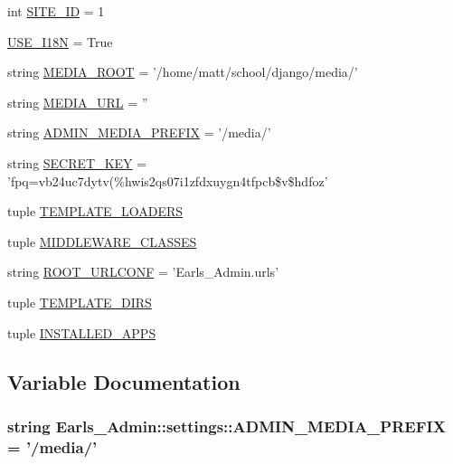 \begin{CompactItemize}
\item 
int \hyperlink{namespaceEarls__Admin_1_1settings_2fc043980861294abcff6dece3e61608}{SITE\_\-ID} = 1
\item 
\hyperlink{namespaceEarls__Admin_1_1settings_81596e34e2b70709757aa85c6d98570b}{USE\_\-I18N} = True
\item 
string \hyperlink{namespaceEarls__Admin_1_1settings_48b28eec713c9de9ed6cb2ff2b8a5453}{MEDIA\_\-ROOT} = '/home/matt/school/django/media/'
\item 
string \hyperlink{namespaceEarls__Admin_1_1settings_32367b73c89b853f97f4345da065eb4d}{MEDIA\_\-URL} = ''
\item 
string \hyperlink{namespaceEarls__Admin_1_1settings_4e253f599c84eaf79ee2d972efa99c38}{ADMIN\_\-MEDIA\_\-PREFIX} = '/media/'
\item 
string \hyperlink{namespaceEarls__Admin_1_1settings_f09be1430acd1d6821f2f79cf8db34f2}{SECRET\_\-KEY} = 'fpq=vb24uc7dytv(\%hwis2qs07i1zfdxuygn4tfpcb\$v\$hdfoz'
\item 
tuple \hyperlink{namespaceEarls__Admin_1_1settings_0f0437dc7c05b7882493e1f5954d3b1c}{TEMPLATE\_\-LOADERS}
\item 
tuple \hyperlink{namespaceEarls__Admin_1_1settings_a4d13fde465389a24a003c48cdec77f0}{MIDDLEWARE\_\-CLASSES}
\item 
string \hyperlink{namespaceEarls__Admin_1_1settings_2916accd1d1268d43e9e42a5c4cae02e}{ROOT\_\-URLCONF} = 'Earls\_\-Admin.urls'
\item 
tuple \hyperlink{namespaceEarls__Admin_1_1settings_b09f5b74aa416bcef75ea632d86ec87f}{TEMPLATE\_\-DIRS}
\item 
tuple \hyperlink{namespaceEarls__Admin_1_1settings_192238fe7cae5ce1c358531630d09992}{INSTALLED\_\-APPS}
\end{CompactItemize}


\subsection{Variable Documentation}
\hypertarget{namespaceEarls__Admin_1_1settings_4e253f599c84eaf79ee2d972efa99c38}{
\subsubsection[ADMIN\_\-MEDIA\_\-PREFIX]{\setlength{\rightskip}{0pt plus 5cm}string {\bf Earls\_\-Admin::settings::ADMIN\_\-MEDIA\_\-PREFIX} = '/media/'}}
\label{namespaceEarls__Admin_1_1settings_4e253f599c84eaf79ee2d972efa99c38}




